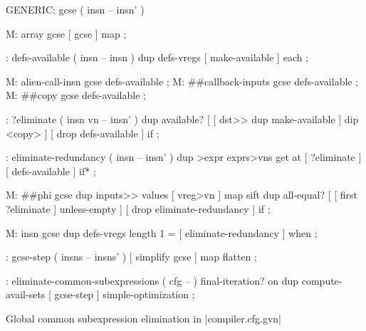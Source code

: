 \centering

  \begin{factorcode}
    GENERIC: gcse ( insn -- insn' )

    M: array gcse [ gcse ] map ;

    : defs-available ( insn -- insn )
        dup defs-vregs [ make-available ] each ;

    M: alien-call-insn gcse defs-available ;
    M: ##callback-inputs gcse defs-available ;
    M: ##copy gcse defs-available ;

    : ?eliminate ( insn vn -- insn' )
        dup available? [
            [ dst>> dup make-available ] dip <copy>
        ] [ drop defs-available ] if ;

    : eliminate-redundancy ( insn -- insn' )
        dup >expr exprs>vns get at
        [ ?eliminate ] [ defs-available ] if* ;

    M: ##phi gcse
        dup inputs>> values [ vreg>vn ] map sift
        dup all-equal? [
            [ first ?eliminate ] unless-empty
        ] [ drop eliminate-redundancy ] if ;

    M: insn gcse
        dup defs-vregs length 1 = [ eliminate-redundancy ] when ;

    : gcse-step ( insns -- insns' )
        [ simplify gcse ] map flatten ;

    : eliminate-common-subexpressions ( cfg -- )
        final-iteration? on
        dup compute-avail-sets
        [ gcse-step ] simple-optimization ;
  \end{factorcode}

\caption{Global common subexpression elimination in \factor|compiler.cfg.gvn|}
